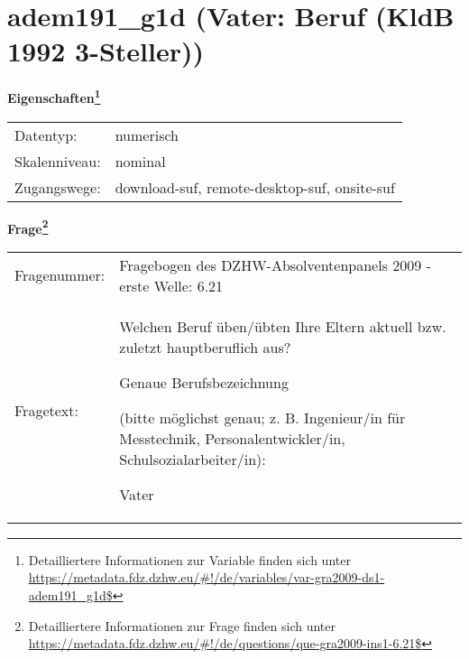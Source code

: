 
    \setcounter{footnote}{0}

    \vspace*{-1.8cm}
	\section{adem191\_g1d (Vater: Beruf (KldB 1992 3-Steller))}
	\label{section:adem191_g1d}



    \vspace*{0.5cm}
    \noindent\textbf{Eigenschaften\footnote{Detailliertere Informationen zur Variable finden sich unter
		\url{https://metadata.fdz.dzhw.eu/\#!/de/variables/var-gra2009-ds1-adem191_g1d$}}}\\
	\begin{tabularx}{\hsize}{@{}lX}
	Datentyp: & numerisch \\
	Skalenniveau: & nominal \\
	Zugangswege: &
	  download-suf, 
	  remote-desktop-suf, 
	  onsite-suf
 \\
    \end{tabularx}



				\vspace*{0.5cm}
                \noindent\textbf{Frage\footnote{Detailliertere Informationen zur Frage finden sich unter
		              \url{https://metadata.fdz.dzhw.eu/\#!/de/questions/que-gra2009-ins1-6.21$}}}\\
				\begin{tabularx}{\hsize}{@{}lX}
					Fragenummer: &
					  Fragebogen des DZHW-Absolventenpanels 2009 - erste Welle:
					  6.21
 \\
					Fragetext: & Welchen Beruf üben/übten Ihre Eltern aktuell bzw. zuletzt hauptberuflich aus?\par  Genaue Berufsbezeichnung\par  (bitte möglichst genau; z. B. Ingenieur/in für Messtechnik, Personalentwickler/in, Schulsozialarbeiter/in):\par  Vater \\
				\end{tabularx}





